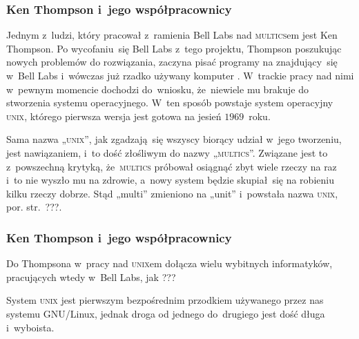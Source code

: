 \documentclass[10pt,t]{beamer}
\begin{document}
\begin{frame}
  \frametitle{Ken Thompson i~jego współpracownicy}


  Jednym z~ludzi, który pracował z~ramienia Bell Labs nad \textsc{multics}em
  jest 
  {Ken Thompson}. Po wycofaniu~się Bell Labs z~tego projektu, Thompson
  poszukując nowych problemów do rozwiązania, zaczyna pisać programy na
  znajdujący~się w~Bell Labs i~wówczas już rzadko używany komputer
  .
  W~trackie pracy nad nimi w~pewnym momencie dochodzi do~wniosku,
  że~niewiele mu brakuje do stworzenia systemu operacyjnego. W~ten sposób
  powstaje system operacyjny \textsc{unix}, którego pierwsza wersja
  jest gotowa na jesień $1969$~roku.

  Sama nazwa „\textsc{unix}”,
  jak zgadzają~się wszyscy biorący udział w~jego tworzeniu, jest
  nawiązaniem, i~to dość złośliwym do nazwy „\textsc{multics}”.
  Związane jest to z~powszechną krytyką, że~\textsc{multics} próbował
  osiągnąć zbyt wiele rzeczy na raz i~to nie wyszło mu na zdrowie,
  a~nowy system będzie skupiał~się na robieniu kilku rzeczy dobrze. Stąd
  „multi” zmieniono na „unit” i~powstała nazwa \textsc{unix}, por.
  str.~???.

\end{frame}





\begin{frame}
  \frametitle{Ken Thompson i~jego współpracownicy}


  Do Thompsona w~pracy nad \textsc{unix}em dołącza wielu wybitnych
  informatyków, pracujących wtedy w~Bell Labs, jak ???

  System \textsc{unix} jest pierwszym bezpośrednim przodkiem używanego
  przez nas systemu GNU/Linux, jednak droga od jednego do~drugiego
  jest dość długa i~wyboista.

\end{frame}
\end{document}
